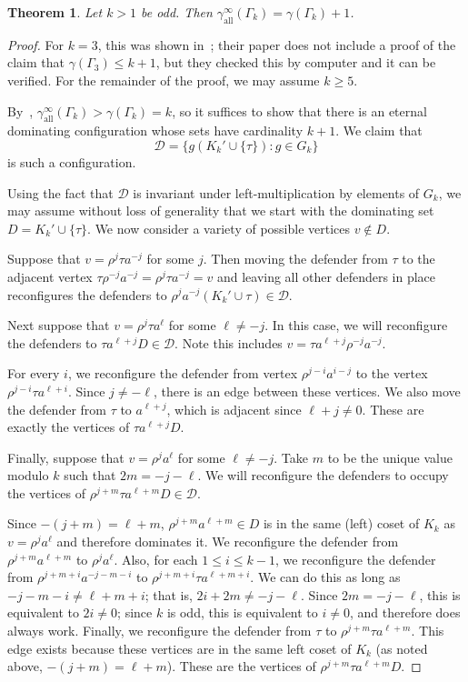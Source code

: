 \documentclass{amsart}
\newtheorem{thm}{Theorem}[section]
\theoremstyle{remark}
\theoremstyle{definition}
\newcommand{\etdom}{\gamma_{\mathrm{all}}^\infty}
\begin{document}
\begin{thm}
    Let $k >1$ be odd. Then $\etdom(\Gamma_k)=\gamma(\Gamma_k)+1$.
\end{thm}

\begin{proof}
    For $k=3$, this was shown in~\cite{BSL2016}; their paper does not include a proof of the claim that $\gamma(\Gamma_3) \le k+1$, but they checked this by computer and it can be verified. For the remainder of the proof, we may assume $k \ge 5$.

    By~, $\etdom(\Gamma_k)>\gamma(\Gamma_k)=k$, so it suffices to show that there is an eternal dominating configuration whose sets have cardinality $k+1$. We claim that $$\mathcal D=\{g(K_k'\cup \{\tau\}): g \in G_k\}$$ is such a configuration. 

    Using the fact that $\mathcal D$ is invariant under left-multiplication by elements of $G_k$, we may assume without loss of generality that we start with the dominating set $D=K_k'\cup \{\tau\}$. We now consider a variety of possible vertices $v \notin D$. 

    Suppose that $v=\rho^j\tau a^{-j}$ for some $j$. Then moving the defender from $\tau$ to the adjacent vertex $\tau\rho^{-j}a^{-j}=\rho^j\tau a^{-j}=v$ and leaving all other defenders in place reconfigures the defenders to $\rho^ja^{-j}(K_k'\cup \tau) \in \mathcal D$. 

    Next suppose that $v=\rho^j\tau a^\ell$ for some $\ell \neq -j$. In this case, we will reconfigure the defenders to $\tau a^{\ell+j} D \in \mathcal D$. Note this includes $v=\tau a^{\ell+j}\rho^{-j}a^{-j}$.

    For every $i$, we reconfigure the defender from vertex $\rho^{j-i} a^{i-j}$ to the vertex $\rho^{j-i}\tau a^{\ell+i}$. Since $j \neq -\ell$, there is an edge between these vertices. We also move the defender from $\tau$ to $a^{\ell+j}$, which is adjacent since $\ell+j\neq 0$. These are exactly the vertices of $\tau a^{\ell+j}D$.
    
    Finally, suppose that $v=\rho^j a^\ell$ for some $\ell \neq -j$. Take $m$ to be the unique value modulo $k$ such that $2m = -j-\ell$. We will reconfigure the defenders to occupy the vertices of $\rho^{j+m}\tau a^{\ell+m}D \in \mathcal D$.
    
    Since $-(j+m)=\ell+m$, $\rho^{j+m} a^{\ell+m} \in D$ is in the same (left) coset of $K_k$ as $v=\rho^j a^{\ell}$ and therefore dominates it. We reconfigure the defender from $\rho^{j+m} a^{\ell+m}$ to $\rho^j a^\ell$. Also, for each $1 \le i \le k-1$, we reconfigure the defender from $\rho^{j+m+i}a^{-j-m-i}$ to $\rho^{j+m+i}\tau a^{\ell+m+i}$. We can do this as long as $-j-m-i \neq \ell+m+i$; that is, $2i+2m \neq -j-\ell$. Since $2m=-j-\ell$, this is equivalent to $2i\neq 0$; since $k$ is odd, this is equivalent to $i \neq 0$, and therefore does always work. Finally, we reconfigure the defender from $\tau$ to $\rho^{j+m}\tau a^{\ell+m}$. This edge exists because these vertices are in the same left coset of $K_k$ (as noted above, $-(j+m)=\ell+m$). These are the vertices of $\rho^{j+m}\tau a^{\ell+m}D$.  
\end{proof}
\end{document}
